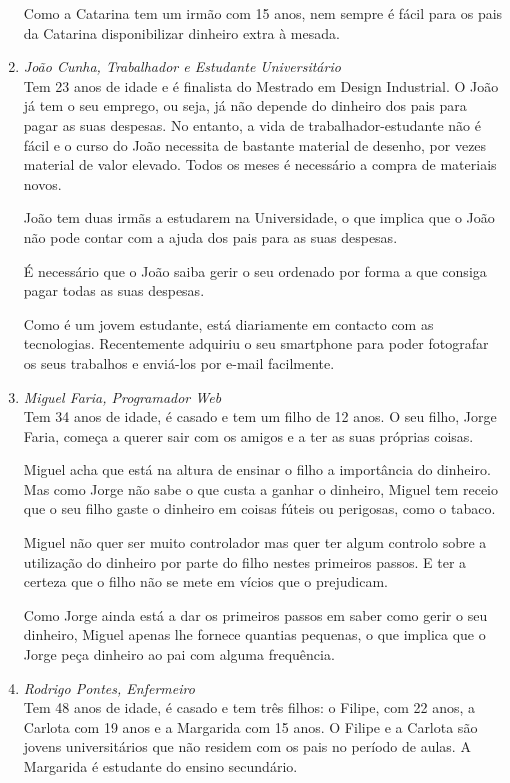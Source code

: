 \documentclass{article}
\begin{document}
\begin{enumerate}
            Como a Catarina tem um irmão com 15 anos, nem sempre é fácil para os pais da Catarina disponibilizar dinheiro extra à mesada.

      \item \emph{João Cunha, Trabalhador e Estudante Universitário}\\
            Tem 23 anos de idade e é finalista do Mestrado em Design Industrial. O João já tem o seu emprego, ou seja, já não depende do dinheiro dos pais para pagar as suas despesas. No entanto, a vida de trabalhador-estudante não é fácil e o curso do João necessita de bastante material de desenho, por vezes material de valor elevado. Todos os meses é necessário a compra de materiais novos.

            João tem duas irmãs a estudarem na Universidade, o que implica que o João não pode contar com a ajuda dos pais para as suas despesas.

            É necessário que o João saiba gerir o seu ordenado por forma a que consiga pagar todas as suas despesas.

            Como é um jovem estudante, está diariamente em contacto com as tecnologias. Recentemente adquiriu o seu smartphone para poder fotografar os seus trabalhos e enviá-los por e-mail facilmente.

      \item \emph{Miguel Faria, Programador Web}\\
            Tem 34 anos de idade, é casado e tem um filho de 12 anos. O seu filho, Jorge Faria, começa a querer sair com os amigos e a ter as suas próprias coisas.

            Miguel acha que está na altura de ensinar o filho a importância do dinheiro. Mas como Jorge não sabe o que custa a ganhar o dinheiro, Miguel tem receio que o seu filho gaste o dinheiro em coisas fúteis ou perigosas, como o tabaco.

            Miguel não quer ser muito controlador mas quer ter algum controlo sobre a utilização do dinheiro por parte do filho nestes primeiros passos. E ter a certeza que o filho não se mete em vícios que o prejudicam.

            Como Jorge ainda está a dar os primeiros passos em saber como gerir o seu dinheiro, Miguel apenas lhe fornece quantias pequenas, o que implica que o Jorge peça dinheiro ao pai com alguma frequência.

      \item \emph{Rodrigo Pontes, Enfermeiro}\\
            Tem 48 anos de idade, é casado e tem três filhos: o Filipe, com 22 anos, a Carlota com 19 anos e a Margarida com 15 anos. O Filipe e a Carlota são jovens universitários que não residem com os pais no período de aulas. A Margarida é estudante do ensino secundário.


\end{enumerate}
\end{document}
